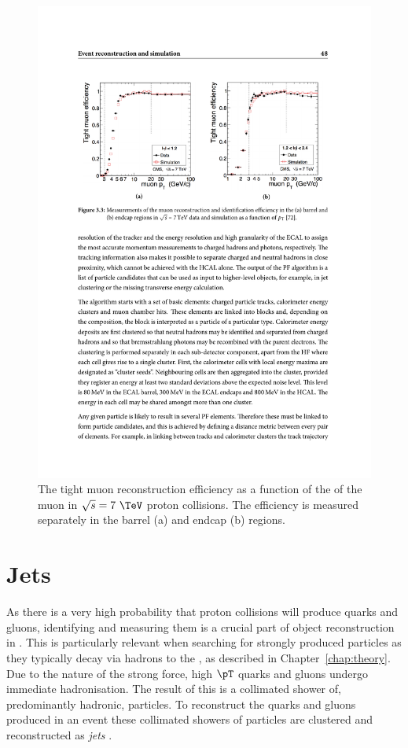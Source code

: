 \begin{figure}
\begin{center}
\includegraphics[width=0.9\linewidth]{figs/reconstruction/muonEff} \end{center}
\caption{ The tight muon reconstruction efficiency as a function of the
\pt of the muon in $\sqrt{s}=7~\tev$ proton collisions. The efficiency
is measured separately in the barrel (a) and endcap (b) regions.
\cite{1748-0221-7-10-P10002}}
\label{fig:muonEff} \end{figure}

\section{Jets}
\label{sec:jets_reco}

As there is a very high probability that proton collisions will
produce quarks and gluons, identifying and measuring them is a crucial part of
object reconstruction in \CMS. This is particularly relevant when
searching for strongly produced \SUSY particles as they typically
decay via hadrons to the \LSP, as described in
Chapter~\ref{chap:theory}. Due to the nature of the strong force,
high $\pT$ quarks and gluons undergo immediate hadronisation. The
result of this is a collimated shower of, predominantly hadronic,
particles. To reconstruct the quarks and gluons produced in
an event these collimated showers of particles are clustered and
reconstructed as \emph{jets} \cite{Salam2010}.


